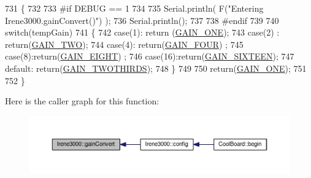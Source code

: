 \begin{DoxyCode}
731 \{
732 
733 \textcolor{preprocessor}{#if DEBUG == 1 }
734 
735     Serial.println( F(\textcolor{stringliteral}{"Entering Irene3000.gainConvert()"}) );
736     Serial.println();
737 
738 \textcolor{preprocessor}{#endif }
739     
740     \textcolor{keywordflow}{switch}(tempGain)
741     \{
742         \textcolor{keywordflow}{case}(1): \textcolor{keywordflow}{return} (\hyperlink{_cool_adafruit___a_d_s1015_8h_a3d6c0e15829a207b9155890811fa4781ab6b0b520637e016e297110bebeb23a54}{GAIN\_ONE});
743         \textcolor{keywordflow}{case}(2) : \textcolor{keywordflow}{return}(\hyperlink{_cool_adafruit___a_d_s1015_8h_a3d6c0e15829a207b9155890811fa4781a447f66a13d0dfbe92462e35f1307cc0d}{GAIN\_TWO});
744         \textcolor{keywordflow}{case}(4): \textcolor{keywordflow}{return}(\hyperlink{_cool_adafruit___a_d_s1015_8h_a3d6c0e15829a207b9155890811fa4781a33fa5521f4e806b7438052fcdbbf8660}{GAIN\_FOUR}) ;   
745         \textcolor{keywordflow}{case}(8):\textcolor{keywordflow}{return}(\hyperlink{_cool_adafruit___a_d_s1015_8h_a3d6c0e15829a207b9155890811fa4781af284da818fc21db27c5ffcfaff7047cb}{GAIN\_EIGHT})  ;  
746         \textcolor{keywordflow}{case}(16):\textcolor{keywordflow}{return}(\hyperlink{_cool_adafruit___a_d_s1015_8h_a3d6c0e15829a207b9155890811fa4781a08fc581748aedabe657bb8aa9464d734}{GAIN\_SIXTEEN});
747         \textcolor{keywordflow}{default}: \textcolor{keywordflow}{return}(\hyperlink{_cool_adafruit___a_d_s1015_8h_a3d6c0e15829a207b9155890811fa4781a879d688347ec0bf159fe1278db602f68}{GAIN\_TWOTHIRDS});  
748     \}
749 
750     \textcolor{keywordflow}{return}(\hyperlink{_cool_adafruit___a_d_s1015_8h_a3d6c0e15829a207b9155890811fa4781ab6b0b520637e016e297110bebeb23a54}{GAIN\_ONE});
751 
752 \}
\end{DoxyCode}
Here is the caller graph for this function\+:\nopagebreak
\begin{figure}[H]
\begin{center}
\leavevmode
\includegraphics[width=350pt]{d6/d03/class_irene3000_abcad62d1201a59f8dd3ba87048002728_icgraph}
\end{center}
\end{figure}
\mbox{\label{class_irene3000_a7bc2414100b5e19eacc6630fa34b2654}} 
